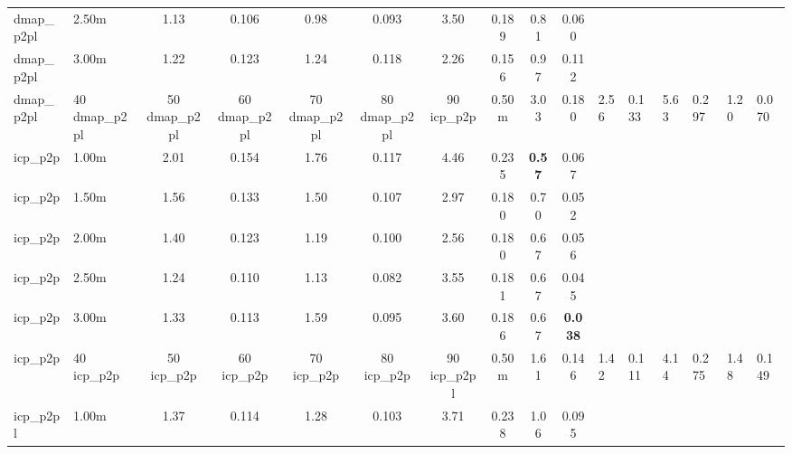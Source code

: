 \begin{tabular}{llcccccccc}
dmap\_p2pl & 2.50m & 1.13 & 0.106 & 0.98 & 0.093 & 3.50 & 0.189 & 0.81 & 0.060 \\
dmap\_p2pl & 3.00m & 1.22 & 0.123 & 1.24 & 0.118 & 2.26 & 0.156 & 0.97 & 0.112 \\
dmap\_p2pl & 40%
dmap\_p2pl & 50%
dmap\_p2pl & 60%
dmap\_p2pl & 70%
dmap\_p2pl & 80%
dmap\_p2pl & 90%
\midrule
icp\_p2p & 0.50m & 3.03 & 0.180 & 2.56 & 0.133 & 5.63 & 0.297 & 1.20 & 0.070 \\
icp\_p2p & 1.00m & 2.01 & 0.154 & 1.76 & 0.117 & 4.46 & 0.235 & \bfseries 0.57 & 0.067 \\
icp\_p2p & 1.50m & 1.56 & 0.133 & 1.50 & 0.107 & 2.97 & 0.180 & 0.70 & 0.052 \\
icp\_p2p & 2.00m & 1.40 & 0.123 & 1.19 & 0.100 & 2.56 & 0.180 & 0.67 & 0.056 \\
icp\_p2p & 2.50m & 1.24 & 0.110 & 1.13 & 0.082 & 3.55 & 0.181 & 0.67 & 0.045 \\
icp\_p2p & 3.00m & 1.33 & 0.113 & 1.59 & 0.095 & 3.60 & 0.186 & 0.67 & \bfseries 0.038 \\
icp\_p2p & 40%
icp\_p2p & 50%
icp\_p2p & 60%
icp\_p2p & 70%
icp\_p2p & 80%
icp\_p2p & 90%
\midrule
icp\_p2pl & 0.50m & 1.61 & 0.146 & 1.42 & 0.111 & 4.14 & 0.275 & 1.48 & 0.149 \\
icp\_p2pl & 1.00m & 1.37 & 0.114 & 1.28 & 0.103 & 3.71 & 0.238 & 1.06 & 0.095 \\

\end{tabular}
